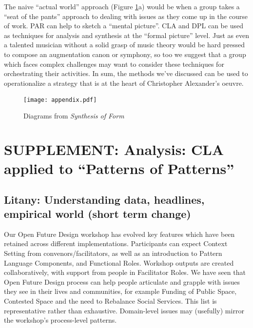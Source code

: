 \documentclass[acmlarge,timestamp]{acmart}
\begin{document}
The naive ``actual world'' approach (Figure \ref{synthesis-diagrams}a)
would be when a group takes a ``seat of the pants'' approach to
dealing with issues as they come up in the course of work.  PAR can
help to sketch a ``mental picture''.  CLA and DPL can be used as
techniques for analysis and synthesis at the ``formal picture'' level.
 Just as even a talented
musician without a solid grasp of music theory would be hard pressed
to compose an augmentation canon or symphony, so too we suggest that a
group which faces complex challenges may want to consider these
techniques for orchestrating their activities.  In sum, the methods
we’ve discussed can be used to operationalize a strategy that is at
the heart of Christopher Alexander’s oeuvre.

\begin{figure}[h]
\texttt{[image: appendix.pdf]}
\caption{Diagrams from \emph{Synthesis of Form}\label{synthesis-diagrams}}
\end{figure}
\FloatBarrier

\section{SUPPLEMENT: Analysis: CLA applied to “Patterns of Patterns”} \label{cla-appendix}
\subsection{Litany: Understanding data, headlines, empirical world (short term change)}
Our Open Future Design workshop has evolved key features which have
been retained across different implementations.  Participants can
expect {\sc Context Setting} from convenors/facilitators, as well as
an introduction to {\sc Pattern Language Components}, and {\sc
  Functional Roles}.  Workshop outputs are created collaboratively,
with support from people in {\sc Facilitator Roles}.  We have seen
that Open Future Design process can help people articulate and grapple
with issues they see in their lives and communities, for example {\sc
  Funding of Public Space}, {\sc Contested Space} and the need to {\sc
  Rebalance Social Services}.  This list is representative rather than
exhaustive.  Domain-level issues may (usefully) mirror the workshop’s
process-level patterns.
\end{document}
